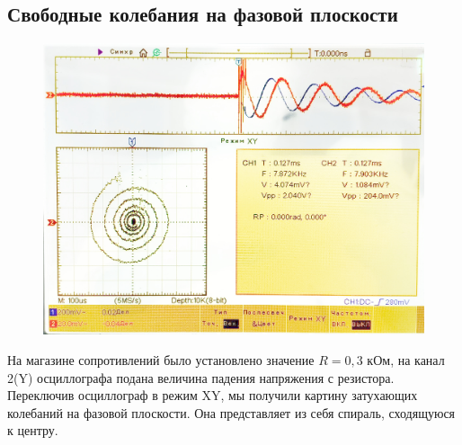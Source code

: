 \subsection*{Свободные колебания на фазовой плоскости}
\begin{figure}
\vspace{-0.5cm}
\includegraphics[scale=0.2]{3.jpg}
\vspace{-40pt}
\end{figure}
На магазине сопротивлений было установлено значение $R = 0,3$ кОм, на канал 2(Y) осциллографа подана величина падения напряжения с резистора. Переключив осциллограф в режим XY, мы получили картину затухающих колебаний на фазовой плоскости. Она представляет из себя спираль, сходящуюся к центру.
\n
